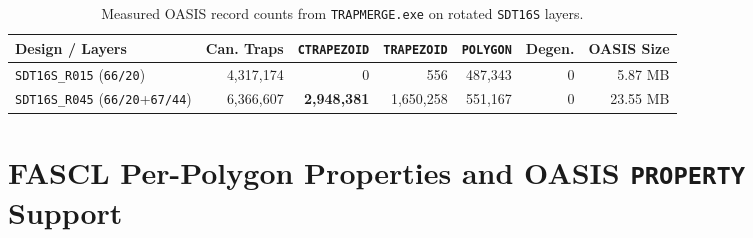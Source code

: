 \begin{table}[htbp]
\centering
\caption{Measured OASIS record counts from \texttt{TRAPMERGE.exe} on rotated \texttt{SDT16S} layers.}
\label{tab:oasis_records}
\small
\begin{tabular}{@{}lrrrrrr@{}}
\toprule
\textbf{Design / Layers} & \textbf{Can. Traps} & \textbf{\texttt{CTRAPEZOID}} & \textbf{\texttt{TRAPEZOID}} & \textbf{\texttt{POLYGON}} & \textbf{Degen.} & \textbf{OASIS Size} \\
\midrule
\texttt{SDT16S\_R015} (\texttt{66/20}) & 4,317,174 & 0 & 556 & 487,343 & 0 & 5.87 MB \\
\texttt{SDT16S\_R045} (\texttt{66/20}+\texttt{67/44}) & 6,366,607 & \textbf{2,948,381} & 1,650,258 & 551,167 & 0 & 23.55 MB \\
\bottomrule
\end{tabular}
\end{table}

\section{FASCL Per-Polygon Properties and OASIS \texttt{PROPERTY} Support}


